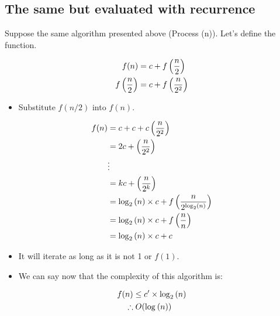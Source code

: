 \subsection{The same but evaluated with recurrence}
Suppose the same algorithm presented above (Process (n)). Let's define the function.
\begin{center}
   \begin{align*}
       f(n) &= c + f \left(\frac{n}{2}\right)  \\ 
       f \left(\frac{n}{2}\right)   &= c + f \left(\frac{n}{2^2}\right)   \\ 
   \end{align*}
   \begin{itemize}
       \item Substitute $f(n/2)$ into $f(n)$.
   \end{itemize}
   \begin{align*}
        f(n) &= c + c + c  \left(\frac{n}{2^2}\right)   \\ 
        &= 2c +  \left(\frac{n}{2^2}\right)   \\ 
        &\vdots \\ 
        &= kc +  \left(\frac{n}{2^k}\right)   \\ 
        &= \log_{2} \left( n \right) \times c + f \left(\frac{n}{2^{\log_{2} \left( n \right)  }} \right)   \\ 
        &= \log_{2} \left( n \right) \times c + f \left(\frac{n}{n}\right)   \\ 
        &= \log_{2} \left( n \right) \times c + c \\ 
   \end{align*}
   \begin{itemize}
       \item It will iterate as long as it is not 1 or $f(1)$.
       \item We can say now that the complexity of this algorithm is: 
   \end{itemize}
   \begin{align*}
       f(n) &\leq c' \times \log_{2} \left( n \right)  \\ 
       \therefore &\; O(\log_{} \left( n \right) ) \\ 
   \end{align*}
\end{center}

